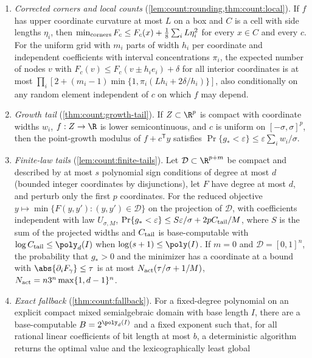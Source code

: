 \begin{enumerate}[label=(T\arabic*),leftmargin=*]
\item\label{it:app:rec:local} \emph{Corrected corners and local counts}
(\cref{lem:count:rounding,thm:count:local}). If $f$ has upper coordinate
curvature at most $L$ on a box and $C$ is a cell with side lengths
$\eta_i$, then $\min_{\rm corners}F_c\le F_c(x)+\frac18\sum_iL\eta_i^2$ for
every $x\in C$ and every $c$. For the uniform grid with $m_i$ parts of width
$h_i$ per coordinate and independent coefficients with interval
concentrations $\pi_i$, the expected number of nodes $v$ with
$F_c(v)\le F_c(v\pm h_ie_i)+\delta$ for all interior coordinates is at most
$\prod_i[2+(m_i-1)\min\{1,\pi_i(Lh_i+2\delta/h_i)\}]$, also conditionally on
any random element independent of $c$ on which $f$ may depend.
\item\label{it:app:rec:growth} \emph{Growth tail}
(\cref{thm:count:growth-tail}). If $Z\subset\R^p$ is compact with coordinate
widths $w_i$, $f:Z\to\R$ is lower semicontinuous, and $c$ is uniform on
$[-\sigma,\sigma]^p$, then the point-growth modulus of $f+c^{\mathsf T}y$
satisfies $\Pr\{g_*<\varepsilon\}\le\varepsilon\sum_iw_i/\sigma$.
\item\label{it:app:rec:finite} \emph{Finite-law tails}
(\cref{lem:count:finite-tails}). Let $\mathcal D\subset\R^{p+m}$ be compact
and described by at most $s$ polynomial sign conditions of degree at most
$d$ (bounded integer coordinates by disjunctions), let $F$ have degree at
most $d$, and perturb only the first $p$ coordinates. For the reduced
objective $y\mapsto\min\{F(y,y'):(y,y')\in\mathcal D\}$ on the projection of
$\mathcal D$, with coefficients independent with law $U_{\sigma,M}$,
$\Pr\{g_*<\varepsilon\}\le S\varepsilon/\sigma+2pC_{\rm tail}/M$, where $S$ is
the sum of the projected widths and $C_{\rm tail}$ is base-computable with
$\log C_{\rm tail}\le\poly_d(I)$ when $\log(s+1)\le\poly(I)$. If $m=0$ and
$\mathcal D=[0,1]^n$, the probability that $g_*>0$ and the minimizer has a
coordinate at a bound with $\abs{\partial_iF_\gamma}\le\tau$ is at most
$N_{\rm act}(\tau/\sigma+1/M)$, $N_{\rm act}=n3^n\max\{1,d-1\}^n$.
\item\label{it:app:rec:fallback} \emph{Exact fallback}
(\cref{thm:count:fallback}). For a fixed-degree polynomial on an explicit
compact mixed semialgebraic domain with base length $I$, there are a
base-computable $B=2^{\poly_d(I)}$ and a fixed exponent such that, for all
rational linear coefficients of bit length at most $b$, a deterministic
algorithm returns the optimal value and the lexicographically least global

\end{enumerate}
